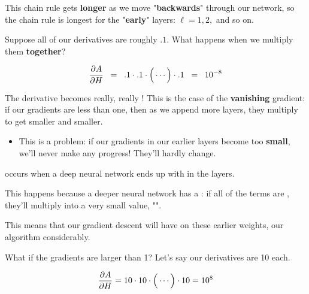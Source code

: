         This chain rule gets \textbf{longer} as we move "\textbf{backwards}" through our network, so the chain rule is longest for the "\textbf{early}" layers: $\ell=1, 2,$ and so on.
        
        Suppose all of our derivatives are roughly $.1$. What happens when we multiply them \textbf{together}?
        
        \begin{equation}
            \frac{\partial A}{\partial H}
            \;\; = \;\;
            .1 \cdot .1 \cdot 
            \Big(
            \cdots
            \Big)
            \cdot 
            .1
            \;\; = \;\;
            10^{-8}
        \end{equation}
        
        The derivative becomes really, really ! This is the case of the \textbf{vanishing} gradient: if our gradients are less than one, then as we append more layers, they multiply to get smaller and smaller.

        \begin{itemize}
            \item This is a problem: if our gradients in our earlier layers become too \textbf{small}, we'll never make any progress! They'll hardly change.\\
        \end{itemize}
        
        
        
        \begin{definition}
             occurs when a deep neural network ends up with  in the  layers. 
            
            This happens because a deeper neural network has a : if all of the terms are , they'll multiply into a very small value, "".
            
            This means that our gradient descent will have  on these earlier weights,  our algorithm considerably.
        \end{definition}
        
        What if the gradients are larger than 1? Let's say our derivatives are 10 each.
        
        \begin{equation}
            \frac{\partial A}{\partial H}
            = 
            10 \cdot 10 \cdot 
            \Big(
            \cdots
            \Big)
            \cdot 
            10
            =
            10^{8}
        \end{equation}
        
